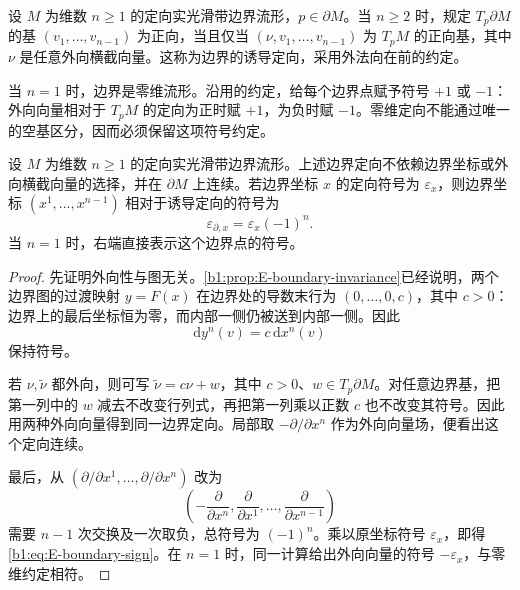 \begin{definition}\label{b1:def:E-boundary-orientation}
设 \(M\) 为维数 \(n\geq1\) 的定向实光滑带边界流形，\(p\in\partial M\)。当 \(n\geq2\) 时，规定 \(T_p\partial M\) 的基 \((v_1,\ldots,v_{n-1})\) 为正向，当且仅当
\((\nu,v_1,\ldots,v_{n-1})\) 为 \(T_pM\) 的正向基，其中 \(\nu\) 是任意外向横截向量。这称为边界的诱导定向，采用外法向在前的约定。

\ProseParagraphBreak

当 \(n=1\) 时，边界是零维流形。沿用的约定，给每个边界点赋予符号 \(+1\) 或 \(-1\)：外向向量相对于 \(T_pM\) 的定向为正时赋 \(+1\)，为负时赋 \(-1\)。零维定向不能通过唯一的空基区分，因而必须保留这项符号约定。
\end{definition}

\begin{proposition}\label{b1:prop:E-boundary-orientation}
设 \(M\) 为维数 \(n\geq1\) 的定向实光滑带边界流形。上述边界定向不依赖边界坐标或外向横截向量的选择，并在 \(\partial M\) 上连续。若边界坐标 \(x\) 的定向符号为 \(\varepsilon_x\)，则边界坐标
\((x^1,\ldots,x^{n-1})\) 相对于诱导定向的符号为
\begin{equation}\label{b1:eq:E-boundary-sign}
 \varepsilon_{\partial,x}=\varepsilon_x(-1)^n.
\end{equation}
当 \(n=1\) 时，右端直接表示这个边界点的符号。
\end{proposition}
\begin{proof}
先证明外向性与图无关。\cref{b1:prop:E-boundary-invariance}已经说明，两个边界图的过渡映射 \(y=F(x)\) 在边界处的导数末行为
\((0,\ldots,0,c)\)，其中 \(c>0\)：边界上的最后坐标恒为零，而内部一侧仍被送到内部一侧。因此
\[
 \mathrm dy^n(v)=c\,\mathrm dx^n(v)
\]
保持符号。

若 \(\nu,\widetilde\nu\) 都外向，则可写
\(\widetilde\nu=c\nu+w\)，其中 \(c>0\)、\(w\in T_p\partial M\)。对任意边界基，把第一列中的 \(w\) 减去不改变行列式，再把第一列乘以正数 \(c\) 也不改变其符号。因此用两种外向向量得到同一边界定向。局部取 \(-\partial/\partial x^n\) 作为外向向量场，便看出这个定向连续。

最后，从
\((\partial/\partial x^1,\ldots,\partial/\partial x^n)\)
改为
\[
 \left(-\frac{\partial}{\partial x^n},
       \frac{\partial}{\partial x^1},\ldots,
       \frac{\partial}{\partial x^{n-1}}\right)
\]
需要 \(n-1\) 次交换及一次取负，总符号为 \((-1)^n\)。乘以原坐标符号 \(\varepsilon_x\)，即得\eqref{b1:eq:E-boundary-sign}。在 \(n=1\) 时，同一计算给出外向向量的符号 \(-\varepsilon_x\)，与零维约定相符。
\end{proof}

